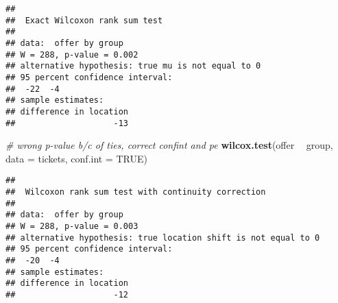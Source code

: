 \documentclass[
]{book}
\newenvironment{Shaded}{\begin{snugshade}}{\end{snugshade}}
\newcommand{\CommentTok}[1]{\textcolor[rgb]{0.56,0.35,0.01}{\textit{#1}}}
\newcommand{\DataTypeTok}[1]{\textcolor[rgb]{0.13,0.29,0.53}{#1}}
\newcommand{\KeywordTok}[1]{\textcolor[rgb]{0.13,0.29,0.53}{\textbf{#1}}}
\newcommand{\NormalTok}[1]{#1}
\newcommand{\OperatorTok}[1]{\textcolor[rgb]{0.81,0.36,0.00}{\textbf{#1}}}
\newcommand{\OtherTok}[1]{\textcolor[rgb]{0.56,0.35,0.01}{#1}}
\newcommand{\StringTok}[1]{\textcolor[rgb]{0.31,0.60,0.02}{#1}}
\begin{document}
\begin{verbatim}
## 
##  Exact Wilcoxon rank sum test
## 
## data:  offer by group
## W = 288, p-value = 0.002
## alternative hypothesis: true mu is not equal to 0
## 95 percent confidence interval:
##  -22  -4
## sample estimates:
## difference in location 
##                    -13
\end{verbatim}

\begin{Shaded}
\begin{Highlighting}[]
\CommentTok{# wrong p-value b/c of ties, correct confint and pe}
\KeywordTok{wilcox.test}\NormalTok{(offer }\OperatorTok{~}\StringTok{ }\NormalTok{group, }\DataTypeTok{data =}\NormalTok{ tickets, }\DataTypeTok{conf.int =} \OtherTok{TRUE}\NormalTok{)}
\end{Highlighting}
\end{Shaded}

\begin{verbatim}
## 
##  Wilcoxon rank sum test with continuity correction
## 
## data:  offer by group
## W = 288, p-value = 0.003
## alternative hypothesis: true location shift is not equal to 0
## 95 percent confidence interval:
##  -20  -4
## sample estimates:
## difference in location 
##                    -12
\end{verbatim}
\end{document}
